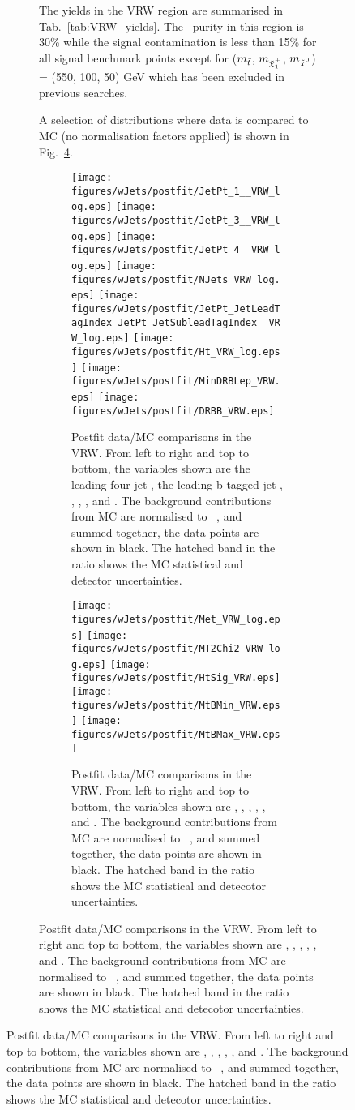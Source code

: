 \begin{figure}[htbp]
\begin{center}
\begin{figure}[htbp]
\begin{center}
{{The yields in the VRW region are summarised in Tab.~\ref{tab:VRW_yields}. The \Wjets\ purity in this region is 30\% while the signal contamination is less than 15\% for all signal benchmark points except for ($m_{\tilde{t}}$, $m_{\chinoonepm}$, $\mLSP$) = (550, 100, 50) GeV which has been excluded in previous searches. 

\begin{table}[!htb]
  \centering
  
  \caption{Yields in the VRW in \intlumi\ \ifb\ of data. The uncertainty on the SF, which is compatible within statistical uncertainties with the SF from the CR, should come down significantly. }
  \label{tab:VRW_yields}
\end{table}

A selection of distributions where data is compared to MC (no normalisation factors applied) is shown in Fig.~\ref{fig:VRW}. 

\begin{figure}[!htb]
  \centering
  \texttt{[image: figures/wJets/postfit/JetPt\_1\_\_VRW\_log.eps]}
  \texttt{[image: figures/wJets/postfit/JetPt\_3\_\_VRW\_log.eps]}
  \texttt{[image: figures/wJets/postfit/JetPt\_4\_\_VRW\_log.eps]}
  \texttt{[image: figures/wJets/postfit/NJets\_VRW\_log.eps]}
  \texttt{[image: figures/wJets/postfit/JetPt\_JetLeadTagIndex\_JetPt\_JetSubleadTagIndex\_\_VRW\_log.eps]}
  \texttt{[image: figures/wJets/postfit/Ht\_VRW\_log.eps]}
  \texttt{[image: figures/wJets/postfit/MinDRBLep\_VRW.eps]}
  \texttt{[image: figures/wJets/postfit/DRBB\_VRW.eps]}
  \caption{Postfit data/MC comparisons in the VRW. From left to right and top to bottom, the variables shown are the leading four jet \pt, the leading b-tagged jet \pt, \HT, \htsig, \mindrblep, and \drbjetbjet. The background contributions from MC are normalised to \intlumi\ \ifb, and summed together, the data points are shown in black. The hatched band in the ratio shows the MC statistical and detector uncertainties.}
  \label{fig:VRWpts}
\end{figure}

\begin{figure}[!htb]
  \centering
  \texttt{[image: figures/wJets/postfit/Met\_VRW\_log.eps]}
  \texttt{[image: figures/wJets/postfit/MT2Chi2\_VRW\_log.eps]}
  \texttt{[image: figures/wJets/postfit/HtSig\_VRW.eps]}
  \texttt{[image: figures/wJets/postfit/MtBMin\_VRW.eps]}
  \texttt{[image: figures/wJets/postfit/MtBMax\_VRW.eps]}
  \caption{Postfit data/MC comparisons in the VRW. From left to right and top to bottom, the variables shown are \met, \mtbmin, \mtbmax, \mantikttwelvezero, \mantikttwelveone, and \mantikteightzero. The background contributions from MC are normalised to \intlumi\ \ifb, and summed together, the data points are shown in black. The hatched band in the ratio shows the MC statistical and detecotor uncertainties.}
  \label{fig:VRW}
\end{figure}

}}
\end{center}
\end{figure}
\end{center}
\end{figure}
